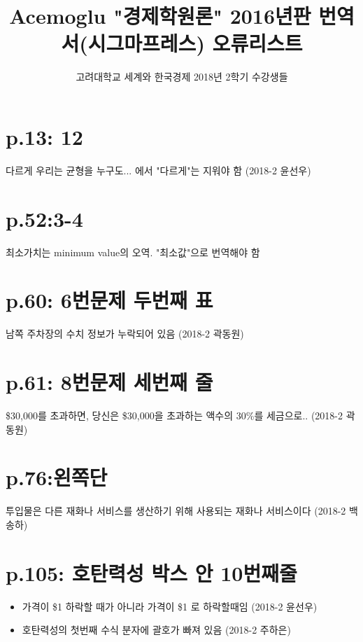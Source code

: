 \documentclass[a4paper]{article}
\author{고려대학교 세계와 한국경제 2018년 2학기 수강생들}
\title{Acemoglu "경제학원론" 2016년판 번역서(시그마프레스) 오류리스트}
\begin{document}
\maketitle
	
\section{p.13: 12} %
\label{sec:p_13_12}
다르게 우리는 균형을 누구도... 에서 "다르게"는 지워야 함 (2018-2 윤선우)

\section{p.52:3-4} %
\label{sec:p_52_3_4}
최소가치는 minimum value의 오역. "최소값"으로 번역해야 함

\section{p.60: 6번문제 두번째 표} %
\label{sec:p_60_6}
남쪽 주차장의 수치 정보가 누락되어 있음 (2018-2 곽동원)

\section{p.61: 8번문제 세번째 줄} %
\label{sec:p_61_8}
\$30,000를 초과하면, 당신은 \$30,000을 초과하는 액수의 30\%를 세금으로.. (2018-2 곽동원)

\section{p.76:왼쪽단} %
\label{sec:p_76_}
투입물은 다른 재화나 서비스를 생산하기 위해 사용되는 재화나 서비스이다
(2018-2 백송하)

\section{p.105: 호탄력성 박스 안 10번째줄} %
\label{sec:p_105_}
\begin{itemize}
	\item 가격이 \$1 하락할 때가 아니라 가격이 \$1 로 하락할때임 (2018-2 윤선우)

	\item 호탄력성의 첫번째 수식 분자에 괄호가 빠져 있음 (2018-2 주하은)
\end{itemize}
\end{document}
